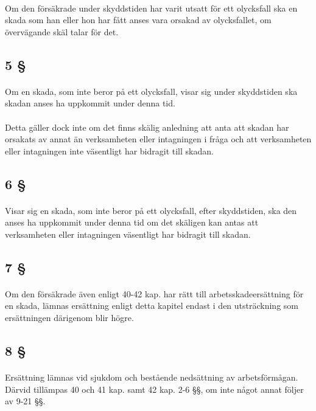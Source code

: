\documentclass[a4paper,notitlepage,openany,10pt]{book}
\begin{document}
\paragraph*{}
Om den försäkrade under skyddstiden har varit utsatt för ett olycksfall ska en skada som han eller hon har fått anses vara orsakad av olycksfallet, om övervägande skäl talar för det.
\subsection*{5 §}
\paragraph*{}
Om en skada, som inte beror på ett olycksfall, visar sig under skyddstiden ska skadan anses ha uppkommit under denna tid.
\paragraph*{}
Detta gäller dock inte om det finns skälig anledning att anta att skadan har orsakats av annat än verksamheten eller intagningen i fråga och att verksamheten eller intagningen inte väsentligt har bidragit till skadan.
\subsection*{6 §}
\paragraph*{}
Visar sig en skada, som inte beror på ett olycksfall, efter skyddstiden, ska den anses ha uppkommit under denna tid om det skäligen kan antas att verksamheten eller intagningen väsentligt har bidragit till skadan.
\subsection*{7 §}
\paragraph*{}
Om den försäkrade även enligt 40-42 kap. har rätt till arbetsskadeersättning för en skada, lämnas ersättning enligt detta kapitel endast i den utsträckning som ersättningen därigenom blir högre.
\subsection*{8 §}
\paragraph*{}
Ersättning lämnas vid sjukdom och bestående nedsättning av arbetsförmågan. Därvid tillämpas 40 och 41 kap. samt 42 kap. 2-6 §§, om inte något annat följer av 9-21 §§.
\end{document}
